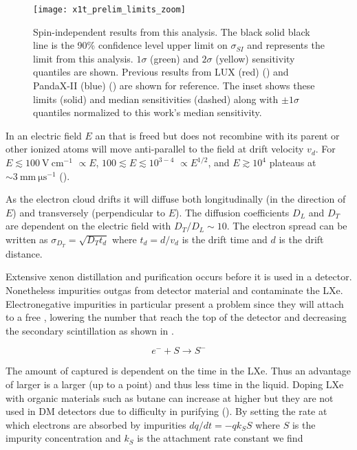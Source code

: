 \begin{figure}
\centering
\texttt{[image: x1t\_prelim\_limits\_zoom]}
\caption{Spin-independent results from this analysis.  The black solid black line is the 90\% confidence level upper limit on
$\sigma_{SI}$ and represents the limit from this analysis.  $1 \sigma$ (green) and $2 \sigma$ (yellow) sensitivity quantiles are
shown.  Previous results from LUX (red) () and PandaX-II (blue) () are shown for reference.  The
inset shows these limits (solid) and median sensitivities (dashed) along with $\pm 1 \sigma$ quantiles normalized to this work's median
sensitivity.}
\label{fig:dark_matter_results_limit}
\end{figure}





In an electric field $E$ an \electron that is freed but does not recombine with its parent or other ionized atoms will move anti-parallel
to the field at drift velocity $v_{d}$.  For $E \lesssim 100\ \mathrm{V\ cm^{-1}}$ \vd$\propto E$, $100 \lesssim E \lesssim 10^{3-4}$
\vd$\propto E^{1/2}$, and $E \gtrsim 10^{4}$ \vd plateaus at $\sim 3\ \mathrm{mm\ \mu s^{-1}}$ ().


As the electron cloud drifts it will diffuse both longitudinally (in the direction of $E$) and transversely (perpendicular to $E$).  The
diffusion coefficients $D_{L}$ and $D_{T}$ are dependent on the electric field with $D_{T}/D_{L} \sim 10$.  The electron spread can
be written as $\sigma_{D_{T}} = \sqrt{D_{T} t_{d}}$ where $t_{d} = d/v_{d}$ is the drift time and $d$ is the drift distance.

Extensive xenon distillation and purification occurs before it is used in a detector.  Nonetheless impurities outgas from detector
material and contaminate the LXe.  Electronegative impurities in particular present a problem since they will attach to a free \electron,
lowering the number that reach the top of the detector and decreasing the secondary scintillation as shown in .

\begin{equation}
e^{-} + S \rightarrow S^{-}
\label{eq:impurity_attach}
\end{equation}

\noindent The amount of \electron captured is dependent on the time in the LXe.  Thus an advantage of larger \efields is a larger
\vd (up to a point) and thus less time in the liquid.  Doping LXe with organic materials such as butane can increase \vd at higher
\efields but they are not used in DM detectors due to difficulty in purifying ().  By setting the rate at which
electrons are absorbed by impurities $dq/dt = -qk_{S}S$ where $S$ is the impurity concentration and $k_{S}$ is the attachment rate
constant we find

